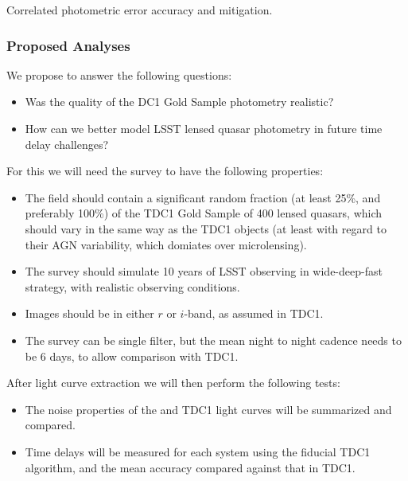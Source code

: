 Correlated photometric error accuracy and mitigation.



\subsubsection{Proposed Analyses}
\label{\secname:stronglensing:analyses}

We propose to answer the following questions:
\begin{itemize}
\item Was the quality of the DC1 Gold Sample photometry realistic?
\item How can we better model LSST lensed quasar photometry in future time delay challenges?
\end{itemize}

For this we will need the \TwinklesOne survey to have the following
properties:
\begin{itemize}
\item The field should contain a significant random fraction (at least
25\%,  and preferably 100\%) of the TDC1 Gold Sample of 400 lensed
quasars,  which should vary in the same way as the TDC1 objects (at
least with regard to their  AGN variability, which domiates over
microlensing).
\item The survey should simulate 10 years of LSST observing in
wide-deep-fast strategy, with realistic observing conditions.
\item Images should be in either $r$ or $i$-band, as assumed in TDC1.
\item The survey can be single filter, but the mean night to night
cadence needs to be 6 days, to allow comparison with TDC1.
\end{itemize}

After light curve extraction we will then perform the following tests:
\begin{itemize}
\item The noise properties of the \TwinklesOne and TDC1 light curves
will be summarized and compared.
\item Time delays will be measured for each system using the fiducial
TDC1 algorithm, and the mean accuracy compared against that in TDC1.
\end{itemize}


